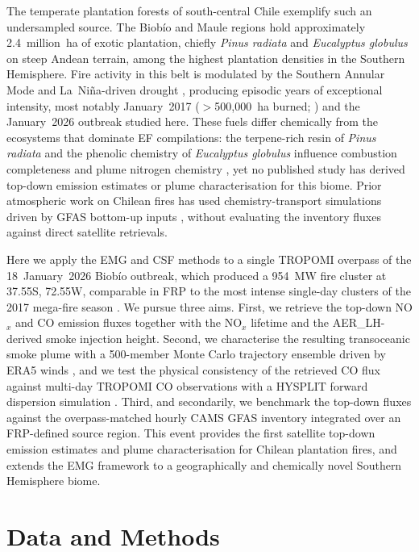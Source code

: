 \documentclass[draft]{agujournal2019}
\newcommand{\NOx}{NO$_x$}
\begin{document}
The temperate plantation forests of south-central Chile exemplify such an undersampled source. The Biob\'io and Maule regions hold approximately 2.4~million~ha of exotic plantation, chiefly \textit{Pinus radiata} and \textit{Eucalyptus globulus} on steep Andean terrain, among the highest plantation densities in the Southern Hemisphere. Fire activity in this belt is modulated by the Southern Annular Mode and La~Ni\~na-driven drought \citep{Garreaud2009, UrrutiaJalabert2018}, producing episodic years of exceptional intensity, most notably January~2017 ($>$500{,}000~ha burned; \citealt{Bowman2019}) and the January~2026 outbreak studied here. These fuels differ chemically from the ecosystems that dominate EF compilations: the terpene-rich resin of \textit{Pinus radiata} and the phenolic chemistry of \textit{Eucalyptus globulus} influence combustion completeness and plume nitrogen chemistry \citep{Yokelson2013, Weise2022}, yet no published study has derived top-down emission estimates or plume characterisation for this biome. Prior atmospheric work on Chilean fires has used chemistry-transport simulations driven by GFAS bottom-up inputs \citep{Lapere2021}, without evaluating the inventory fluxes against direct satellite retrievals.

Here we apply the EMG and CSF methods to a single TROPOMI overpass of the 18~January~2026 Biob\'io outbreak, which produced a 954~MW fire cluster at 37.55\degree{}S, 72.55\degree{}W, comparable in FRP to the most intense single-day clusters of the 2017 mega-fire season \citep{Bowman2019}. We pursue three aims. First, we retrieve the top-down \NOx{} and CO emission fluxes together with the \NOx{} lifetime and the AER\_LH-derived smoke injection height. Second, we characterise the resulting transoceanic smoke plume with a 500-member Monte Carlo trajectory ensemble driven by ERA5 winds \citep{Hersbach2020}, and we test the physical consistency of the retrieved CO flux against multi-day TROPOMI CO observations with a HYSPLIT forward dispersion simulation \citep{Stein2015}. Third, and secondarily, we benchmark the top-down fluxes against the overpass-matched hourly CAMS GFAS inventory integrated over an FRP-defined source region. This event provides the first satellite top-down emission estimates and plume characterisation for Chilean plantation fires, and extends the \citet{Jin2021} EMG framework to a geographically and chemically novel Southern Hemisphere biome.

\section{Data and Methods}
\label{sec:methods}
\end{document}
